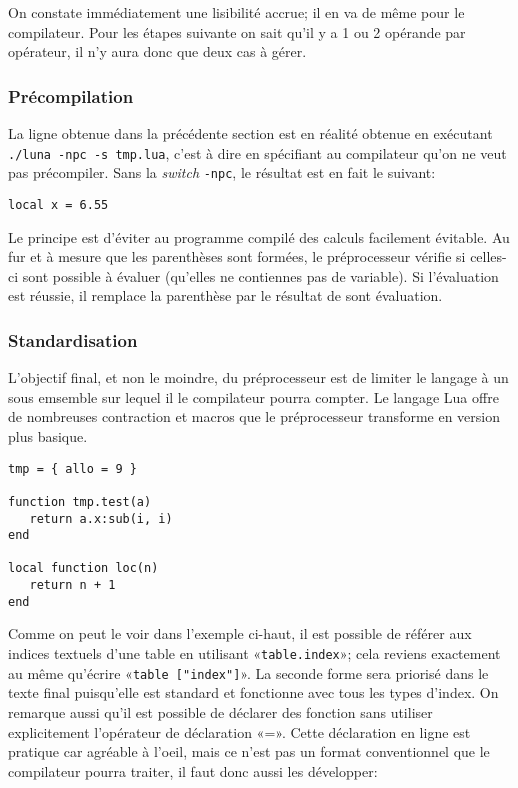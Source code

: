 \documentclass{article}
\begin{document}
On constate immédiatement une lisibilité accrue; il en va de même pour le compilateur. Pour les étapes suivante on sait qu'il y a 1 ou 2 opérande par opérateur, il n'y aura donc que deux cas à gérer.
\subsubsection{Précompilation}
La ligne obtenue dans la précédente section est en réalité obtenue en exécutant \texttt{./luna -npc -s tmp.lua}, c'est à dire en spécifiant au compilateur qu'on ne veut pas précompiler. Sans la \textit{switch} \texttt{-npc}, le résultat est en fait le suivant:
\begin{lstlisting}[belowcaptionskip = -1\baselineskip]
local x = 6.55
\end{lstlisting}


Le principe est d'éviter au programme compilé des calculs facilement évitable. Au fur et à mesure que les parenthèses sont formées, le préprocesseur vérifie si celles-ci sont possible à évaluer (qu'elles ne contiennes pas de variable). Si l'évaluation est réussie, il remplace la parenthèse par le résultat de sont évaluation.

\newpage
\subsubsection{Standardisation}
L'objectif final, et non le moindre, du préprocesseur est de limiter le langage à un sous emsemble sur lequel il le compilateur pourra compter. Le langage Lua offre de nombreuses contraction et macros que le préprocesseur transforme en version plus basique.
\begin{lstlisting}[caption={Utilisation des contractions et des macros},label=DescriptiveLabel]
tmp = { allo = 9 }

function tmp.test(a)
   return a.x:sub(i, i)
end

local function loc(n)
   return n + 1
end
\end{lstlisting}

Comme on peut le voir dans l'exemple ci-haut, il est possible de référer aux indices textuels d'une table en utilisant «\texttt{table.index}»; cela reviens exactement au même qu'écrire «\texttt{table ["index"]}». La seconde forme sera priorisé dans le texte final puisqu'elle est standard et fonctionne avec tous les types d'index. On remarque aussi qu'il est possible de déclarer des fonction sans utiliser explicitement l'opérateur de déclaration «=». Cette déclaration en ligne est pratique car agréable à l'oeil, mais ce n'est pas un format conventionnel que le compilateur pourra traiter, il faut donc aussi les développer:
\end{document}
